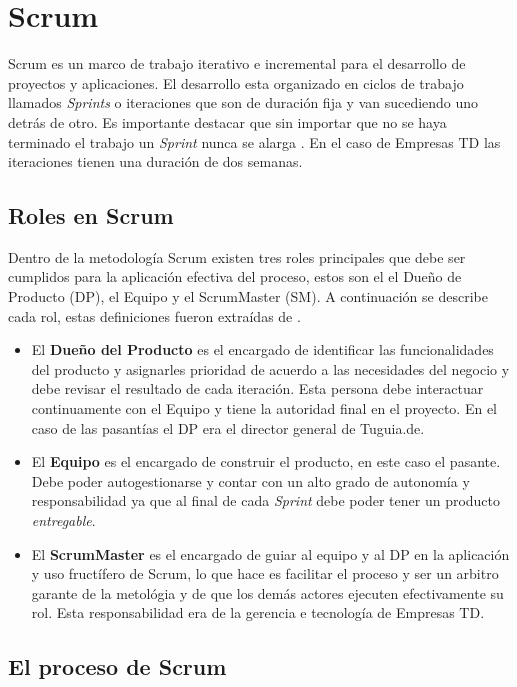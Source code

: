 \section{Scrum} \label{sect:Scrum}

Scrum es un marco de trabajo iterativo e incremental para el desarrollo de proyectos y aplicaciones. El desarrollo esta organizado en ciclos de trabajo llamados \textit{Sprints} o iteraciones que son de duración fija y van sucediendo uno detrás de otro. Es importante destacar que sin importar que no se haya terminado el trabajo un \textit{Sprint} nunca se alarga \cite{DBLV09}. En el caso de Empresas TD las iteraciones tienen una duración de dos semanas.

\subsection{Roles en Scrum} 

Dentro de la metodología Scrum existen tres roles principales que debe ser cumplidos para la aplicación efectiva del proceso, estos son el el Dueño de Producto (DP), el Equipo y el ScrumMaster (SM). A continuación se describe cada rol, estas definiciones fueron extraídas de \cite{DBLV09}.

\begin{itemize}
\item El \textbf{Dueño del Producto} es el encargado de identificar las funcionalidades del producto y asignarles prioridad de acuerdo a las necesidades del negocio y debe revisar el resultado de cada iteración. Esta persona debe interactuar continuamente con el Equipo y tiene la autoridad final en el proyecto. En el caso de las pasantías el DP era el director general de Tuguia.de.
\item El \textbf{Equipo} es el encargado de construir el producto, en este caso el pasante. Debe poder autogestionarse y contar con un alto grado de autonomía y responsabilidad ya que al final de cada \textit{Sprint} debe poder tener un producto \textit{entregable}.
\item El \textbf{ScrumMaster} es el encargado de guiar al equipo y al DP en la aplicación y uso fructífero de Scrum, lo que hace es facilitar el proceso y ser un arbitro garante de la metológia y de que los demás actores ejecuten efectivamente su rol. Esta responsabilidad era de la gerencia e tecnología de Empresas TD.
\end{itemize} 

\subsection{El proceso de Scrum}

